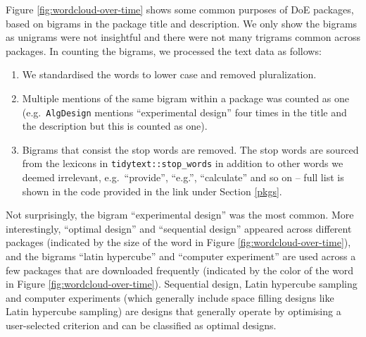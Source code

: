 \documentclass{article}
\providecommand{\tightlist}{%
  \setlength{\itemsep}{0pt}\setlength{\parskip}{0pt}}
\def\tightlist{}
\begin{document}
Figure \ref{fig:wordcloud-over-time} shows some common purposes of DoE
packages, based on bigrams in the package title and description. We only
show the bigrams as unigrams were not insightful and there were not many
trigrams common across packages. In counting the bigrams, we processed
the text data as follows:

\begin{enumerate}
\def\labelenumi{\arabic{enumi}.}
\tightlist
\item
  We standardised the words to lower case and removed pluralization.
\item
  Multiple mentions of the same bigram within a package was counted as
  one (e.g.~\texttt{AlgDesign} mentions ``experimental design'' four
  times in the title and the description but this is counted as one).
\item
  Bigrams that consist the stop words are removed. The stop words are
  sourced from the lexicons in \texttt{tidytext::stop\_words} in
  addition to other words we deemed irrelevant, e.g.~``provide'',
  ``e.g.'', ``calculate'' and so on -- full list is shown in the code
  provided in the link under Section \ref{pkgs}.
\end{enumerate}

Not surprisingly, the bigram ``experimental design'' was the most
common. More interestingly, ``optimal design'' and ``sequential design''
appeared across different packages (indicated by the size of the word in
Figure \ref{fig:wordcloud-over-time}), and the bigrams ``latin
hypercube'' and ``computer experiment'' are used across a few packages
that are downloaded frequently (indicated by the color of the word in
Figure \ref{fig:wordcloud-over-time}). Sequential design, Latin
hypercube sampling and computer experiments (which generally include
space filling designs like Latin hypercube sampling) are designs that
generally operate by optimising a user-selected criterion and can be
classified as optimal designs.
\end{document}
